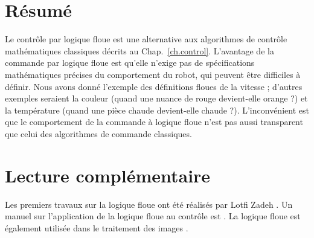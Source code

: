 \section{Résumé}

Le contrôle par logique floue est une alternative aux algorithmes de contrôle mathématiques classiques décrits au Chap.~\ref{ch.control}. L'avantage de la commande par logique floue est qu'elle n'exige pas de spécifications mathématiques précises du comportement du robot, qui peuvent être difficiles à définir. Nous avons donné l'exemple des définitions floues de la vitesse ; d'autres exemples seraient la couleur (quand une nuance de rouge devient-elle orange ?) et la température (quand une pièce chaude devient-elle chaude ?). L'inconvénient est que le comportement de la commande à logique floue n'est pas aussi transparent que celui des algorithmes de commande classiques.

\section{Lecture complémentaire}

Les premiers travaux sur la logique floue ont été réalisés par Lotfi Zadeh \cite{zadeh}. Un manuel sur l'application de la logique floue au contrôle est \cite{passino}.  La logique floue est également utilisée dans le traitement des images \cite[Sect.~3.8]{GW}.

